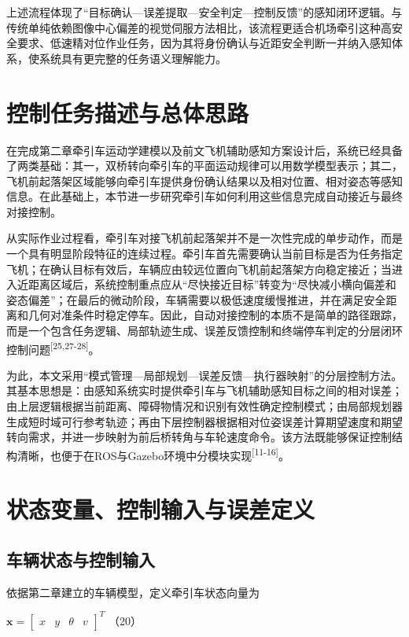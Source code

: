 上述流程体现了“目标确认---误差提取---安全判定---控制反馈”的感知闭环逻辑。与传统单纯依赖图像中心偏差的视觉伺服方法相比，该流程更适合机场牵引这种高安全要求、低速精对位作业任务，因为其将身份确认与近距安全判断一并纳入感知体系，使系统具有更完整的任务语义理解能力。

\section{控制任务描述与总体思路}

在完成第二章牵引车运动学建模以及前文飞机辅助感知方案设计后，系统已经具备了两类基础：其一，双桥转向牵引车的平面运动规律可以用数学模型表示；其二，飞机前起落架区域能够向牵引车提供身份确认结果以及相对位置、相对姿态等感知信息。在此基础上，本节进一步研究牵引车如何利用这些信息完成自动接近与最终对接控制。

从实际作业过程看，牵引车对接飞机前起落架并不是一次性完成的单步动作，而是一个具有明显阶段特征的连续过程。牵引车首先需要确认当前目标是否为任务指定飞机；在确认目标有效后，车辆应由较远位置向飞机前起落架方向稳定接近；当进入近距离区域后，系统控制重点应从“尽快接近目标”转变为“尽快减小横向偏差和姿态偏差”；在最后的微动阶段，车辆需要以极低速度缓慢推进，并在满足安全距离和几何对准条件时稳定停车。因此，自动对接控制的本质不是简单的路径跟踪，而是一个包含任务逻辑、局部轨迹生成、误差反馈控制和终端停车判定的分层闭环控制问题\textsuperscript{[25,27-28]}。

为此，本文采用“模式管理---局部规划---误差反馈---执行器映射”的分层控制方法。其基本思想是：由感知系统实时提供牵引车与飞机辅助感知目标之间的相对误差；由上层逻辑根据当前距离、障碍物情况和识别有效性确定控制模式；由局部规划器生成短时域可行参考轨迹；再由下层控制器根据相对位姿误差计算期望速度和期望转向需求，并进一步映射为前后桥转角与车轮速度命令。该方法既能够保证控制结构清晰，也便于在ROS与Gazebo环境中分模块实现\textsuperscript{[11-16]}。

\section{状态变量、控制输入与误差定义}

\subsection{车辆状态与控制输入}

依据第二章建立的车辆模型，定义牵引车状态向量为

\(\mathbf{x} = \begin{bmatrix}
x & y & \theta & v
\end{bmatrix}^{T}\) （20）

